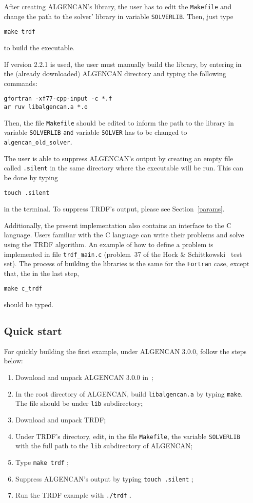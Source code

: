 \documentclass[12pt]{article}
\begin{document}
After creating ALGENCAN's library, the user has to edit the
\texttt{Makefile} and change the path to the solver' library in
variable \texttt{SOLVERLIB}. Then, just type
\begin{verbatim}
make trdf
\end{verbatim}
to build the executable.

If version 2.2.1 is used, the user must manually build the library, by
entering in the (already downloaded) ALGENCAN directory and typing the
following commands:
\begin{verbatim}
gfortran -xf77-cpp-input -c *.f
ar ruv libalgencan.a *.o
\end{verbatim}
Then, the file \texttt{Makefile} should be edited to inform the path
to the library in variable \texttt{SOLVERLIB} \texttt{and} variable
\texttt{SOLVER} has to be changed to \texttt{algencan\_old\_solver}.

The user is able to suppress ALGENCAN's output by creating an empty
file called \texttt{.silent} in the same directory where the
executable will be run. This can be done by typing
\begin{verbatim}
touch .silent
\end{verbatim}
in the terminal. To suppress TRDF's output, please see
Section~\ref{params}.

Additionally, the present implementation also contains an interface to
the C language. Users familiar with the C language can write their
problems and solve using the TRDF algorithm. An example of how to
define a problem is implemented in file \texttt{trdf\_main.c}
(problem~37 of the Hock \& Schittkowski~\cite{hs} test set). The
process of building the libraries is the same for the \texttt{Fortran}
case, except that, the in the last step,
\begin{verbatim}
make c_trdf
\end{verbatim}
should be typed.

\subsection*{Quick start}
For quickly building the first example, under ALGENCAN 3.0.0, follow
the steps below:
\begin{enumerate}
\item Download and unpack ALGENCAN 3.0.0 in~\cite{tango};
\item In the root directory of ALGENCAN, build \texttt{libalgencan.a}
  by typing \texttt{make}. The file should be under \texttt{lib}
  subdirectory;
\item Download and unpack TRDF;
\item Under TRDF's directory, edit, in the file \texttt{Makefile}, the
  variable \texttt{SOLVERLIB} with the full path to the \texttt{lib}
  subdirectory of ALGENCAN;
\item Type \texttt{make trdf} ;
\item Suppress ALGENCAN's output by typing \texttt{touch .silent} ;
\item Run the TRDF example with \texttt{./trdf} .
\end{enumerate}
\end{document}
